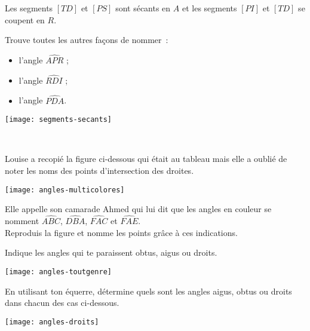 \begin{exercice}
Les segments $[TD]$ et $[PS]$ sont sécants en $A$ et les segments $[PI]$ et $[TD]$ se coupent en $R$.

Trouve toutes les autres façons de nommer : \\[0.5em]
\begin{minipage}[c]{0.2\textwidth}
\begin{itemize}
 \item l'angle $\widehat{APR}$ ;
 \item l'angle $\widehat{RDI}$ ;
 \item l'angle $\widehat{PDA}$.
 \end{itemize}
 \end{minipage} \hfill%
  \begin{minipage}[c]{0.4\textwidth}
  \texttt{[image: segments-secants]}
  \end{minipage} \\
\end{exercice}  


\begin{exercice}
Louise a recopié la figure ci‑dessous qui était au tableau mais elle a oublié de noter les noms des points d'intersection des droites. 
 \begin{center} \texttt{[image: angles-multicolores]}  \end{center}
Elle appelle son camarade Ahmed qui lui dit que les angles en couleur se nomment $\widehat{ABC}$, $\widehat{DBA}$, $\widehat{FAC}$ et $\widehat{FAE}$. \\[0.5em]
Reproduis la figure et nomme les points grâce à ces indications.
\end{exercice}  





\begin{exercice}
Indique les angles qui te paraissent obtus, aigus ou droits.
 \begin{center} \texttt{[image: angles-toutgenre]}  \end{center}
\end{exercice}


\begin{exercice}
En utilisant ton équerre, détermine quels sont les angles aigus, obtus ou droits dans chacun des cas ci-dessous.
 \begin{center} \texttt{[image: angles-droits]}  \end{center}
\end{exercice}


